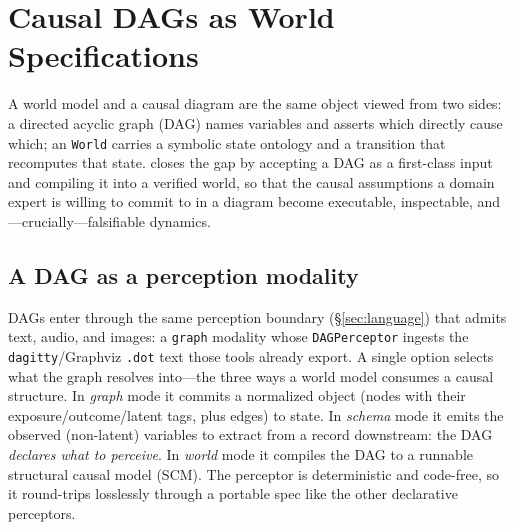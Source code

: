 
\section{Causal DAGs as World Specifications}\label{sec:dag}
A world model and a causal diagram are the same object viewed from two sides: a
directed acyclic graph (DAG) names variables and asserts which directly cause
which; an \openworld{} \texttt{World} carries a symbolic state ontology and a
transition that recomputes that state. \openworld{} closes the gap by accepting
a DAG as a first-class input and compiling it into a verified world, so that the
causal assumptions a domain expert is willing to commit to in a diagram become
executable, inspectable, and---crucially---falsifiable dynamics.

\subsection{A DAG as a perception modality}
DAGs enter through the same perception boundary (\S\ref{sec:language}) that
admits text, audio, and images: a \texttt{graph} modality whose
\texttt{DAGPerceptor} ingests the \texttt{dagitty}/Graphviz \texttt{.dot} text
those tools already export. A single option selects what the graph resolves
into---the three ways a world model consumes a causal structure. In
\emph{graph} mode it commits a normalized object (nodes with their
exposure/outcome/latent tags, plus edges) to state. In \emph{schema} mode it
emits the observed (non-latent) variables to extract from a record downstream:
the DAG \emph{declares what to perceive}. In \emph{world} mode it compiles the
DAG to a runnable structural causal model (SCM). The perceptor is deterministic
and code-free, so it round-trips losslessly through a portable spec like the
other declarative perceptors.

